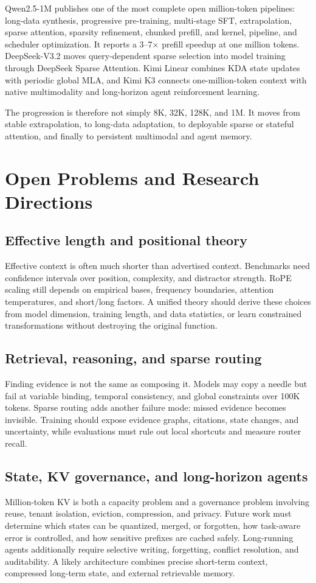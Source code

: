 \documentclass[UTF8,10pt,a4paper,fontset=none]{ctexart}
\begin{document}
Qwen2.5-1M publishes one of the most complete open million-token pipelines: long-data synthesis, progressive pre-training, multi-stage SFT, extrapolation, sparse attention, sparsity refinement, chunked prefill, and kernel, pipeline, and scheduler optimization. It reports a 3--7$\times$ prefill speedup at one million tokens\cite{qwen1m}. DeepSeek-V3.2 moves query-dependent sparse selection into model training through DeepSeek Sparse Attention\cite{deepseekv32}. Kimi Linear combines KDA state updates with periodic global MLA, and Kimi K3 connects one-million-token context with native multimodality and long-horizon agent reinforcement learning\cite{kimiLinear,kimiK3}.

The progression is therefore not simply 8K, 32K, 128K, and 1M. It moves from stable extrapolation, to long-data adaptation, to deployable sparse or stateful attention, and finally to persistent multimodal and agent memory.

\section{Open Problems and Research Directions}

\subsection{Effective length and positional theory}
Effective context is often much shorter than advertised context. Benchmarks need confidence intervals over position, complexity, and distractor strength. RoPE scaling still depends on empirical bases, frequency boundaries, attention temperatures, and short/long factors. A unified theory should derive these choices from model dimension, training length, and data statistics, or learn constrained transformations without destroying the original function.

\subsection{Retrieval, reasoning, and sparse routing}
Finding evidence is not the same as composing it. Models may copy a needle but fail at variable binding, temporal consistency, and global constraints over 100K tokens. Sparse routing adds another failure mode: missed evidence becomes invisible. Training should expose evidence graphs, citations, state changes, and uncertainty, while evaluations must rule out local shortcuts and measure router recall.

\subsection{State, KV governance, and long-horizon agents}
Million-token KV is both a capacity problem and a governance problem involving reuse, tenant isolation, eviction, compression, and privacy. Future work must determine which states can be quantized, merged, or forgotten, how task-aware error is controlled, and how sensitive prefixes are cached safely. Long-running agents additionally require selective writing, forgetting, conflict resolution, and auditability. A likely architecture combines precise short-term context, compressed long-term state, and external retrievable memory.
\end{document}
